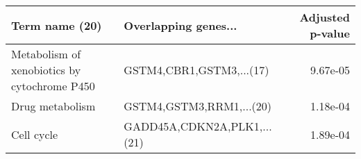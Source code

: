\begin{tabular}{llr}
\toprule
                              Term name (20) &        Overlapping genes... &  Adjusted p-value \\
\midrule
Metabolism of xenobiotics by cytochrome P450 &    GSTM4,CBR1,GSTM3,...(17) &          9.67e-05 \\
                             Drug metabolism &    GSTM4,GSTM3,RRM1,...(20) &          1.18e-04 \\
                                  Cell cycle & GADD45A,CDKN2A,PLK1,...(21) &          1.89e-04 \\
\bottomrule
\end{tabular}
